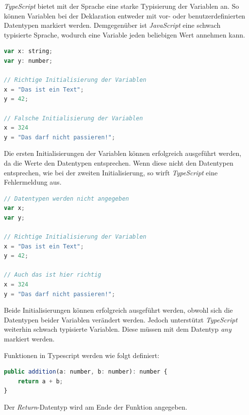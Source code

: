\textit{TypeScript} bietet mit der Sprache eine starke Typisierung der Variablen an. So können Variablen bei der Deklaration entweder mit vor- oder benutzerdefinierten Datentypen markiert werden.
Demgegenüber ist \textit{JavaScript} eine schwach typisierte Sprache, wodurch eine Variable jeden beliebigen Wert annehmen kann.

\lstset{escapechar=?,style=customjava}
\begin{lstlisting}[language=javascript, caption={Starke Typisierung in \textit{TypeScript}}]
var x: string;
var y: number;

// Richtige Initialisierung der Variablen
x = "Das ist ein Text";
y = 42;

// Falsche Initialisierung der Variablen
x = 324
y = "Das darf nicht passieren!";
\end{lstlisting}
\lstset{escapechar=@,style=customjava}

Die ersten Initialisierungen der Variablen können erfolgreich ausgeführt werden, da die Werte den Datentypen entsprechen. Wenn diese nicht den Datentypen entsprechen, wie bei der zweiten Initialisierung, so wirft \textit{TypeScript} eine Fehlermeldung aus.

\lstset{escapechar=?,style=customjava}
\begin{lstlisting}[language=javascript, caption={Schwache Typisierung in \textit{JavaScript}}]
// Datentypen werden nicht angegeben
var x;
var y;

// Richtige Initialisierung der Variablen
x = "Das ist ein Text";
y = 42;

// Auch das ist hier richtig
x = 324
y = "Das darf nicht passieren!";
\end{lstlisting}
\lstset{escapechar=@,style=customjava}

Beide Initialisierungen können erfolgreich ausgeführt werden, obwohl sich die Datentypen beider Variablen verändert werden.
Jedoch unterstützt \textit{TypeScript} weiterhin schwach typisierte Variablen. Diese müssen mit dem Datentyp \textit{any} markiert werden.

Funktionen in Typescript werden wie folgt definiert:
\lstset{escapechar=?,style=customjava}
\begin{lstlisting}[language=javascript, caption={Starke Typisierung bei Funktionen}]
public addition(a: number, b: number): number {
    return a + b;
}
\end{lstlisting}
\lstset{escapechar=@,style=customjava}

Der \textit{Return}-Datentyp wird am Ende der Funktion angegeben.


